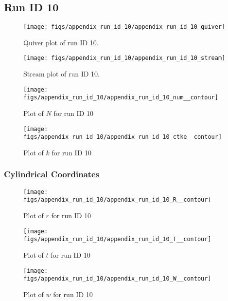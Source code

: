 \subsection{Run ID 10}
\begin{figure}[H]
\centering
\texttt{[image: figs/appendix\_run\_id\_10/appendix\_run\_id\_10\_quiver]}
\caption{Quiver plot of run ID 10.}
\label{fig:appendix_run_id_10_quiver}
\end{figure}


\begin{figure}[H]
\centering
\texttt{[image: figs/appendix\_run\_id\_10/appendix\_run\_id\_10\_stream]}
\caption{Stream plot of run ID 10.}
\label{fig:appendix_run_id_10_stream}
\end{figure}


\begin{figure}[H]
\centering
\texttt{[image: figs/appendix\_run\_id\_10/appendix\_run\_id\_10\_num\_\_contour]}
\caption{Plot of $N$ for run ID 10}
\label{fig:appendix_run_id_10_num__contour}
\end{figure}


\begin{figure}[H]
\centering
\texttt{[image: figs/appendix\_run\_id\_10/appendix\_run\_id\_10\_ctke\_\_contour]}
\caption{Plot of $k$ for run ID 10}
\label{fig:appendix_run_id_10_ctke__contour}
\end{figure}


\subsubsection{Cylindrical Coordinates}
\begin{figure}[H]
\centering
\texttt{[image: figs/appendix\_run\_id\_10/appendix\_run\_id\_10\_R\_\_contour]}
\caption{Plot of $\overline{r}$ for run ID 10}
\label{fig:appendix_run_id_10_R__contour}
\end{figure}


\begin{figure}[H]
\centering
\texttt{[image: figs/appendix\_run\_id\_10/appendix\_run\_id\_10\_T\_\_contour]}
\caption{Plot of $\overline{t}$ for run ID 10}
\label{fig:appendix_run_id_10_T__contour}
\end{figure}


\begin{figure}[H]
\centering
\texttt{[image: figs/appendix\_run\_id\_10/appendix\_run\_id\_10\_W\_\_contour]}
\caption{Plot of $\overline{w}$ for run ID 10}
\label{fig:appendix_run_id_10_W__contour}
\end{figure}


